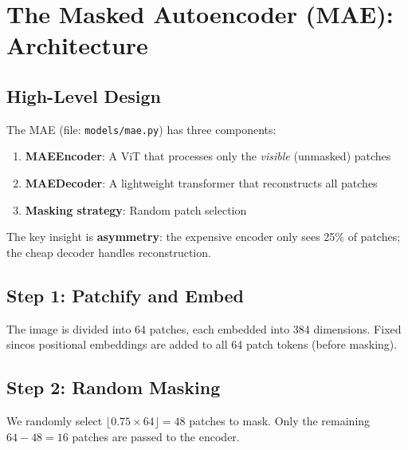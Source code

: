 \documentclass[12pt, a4paper]{report}
\begin{document}
\chapter{The Masked Autoencoder (MAE): Architecture}

\section{High-Level Design}

The MAE (file: \texttt{models/mae.py}) has three components:

\begin{enumerate}
    \item \textbf{MAEEncoder}: A ViT that processes only the \emph{visible} (unmasked) patches
    \item \textbf{MAEDecoder}: A lightweight transformer that reconstructs all patches
    \item \textbf{Masking strategy}: Random patch selection
\end{enumerate}

The key insight is \textbf{asymmetry}: the expensive encoder only sees 25\% of patches; the cheap decoder handles reconstruction.

\section{Step 1: Patchify and Embed}

The image is divided into 64 patches, each embedded into 384 dimensions. Fixed sincos positional embeddings are added to all 64 patch tokens (before masking).

\section{Step 2: Random Masking}

We randomly select $\lfloor 0.75 \times 64 \rfloor = 48$ patches to mask. Only the remaining $64 - 48 = 16$ patches are passed to the encoder.
\end{document}
